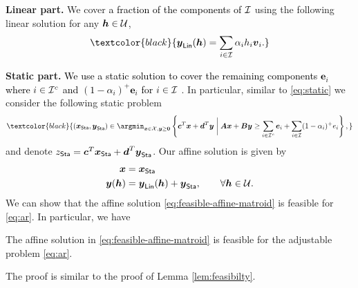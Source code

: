 \documentclass[moor]{informs1}              %
\newcommand{\mb}[1]{\ensuremath{\boldsymbol{#1}}}
\newcommand*{\red}{\textcolor{black}}
\begin{document}
\vspace{2mm}
\noindent
{\bf Linear part.}
We cover \red{ a fraction of the components of ${\cal I}$} using the following linear solution for any $ \mb h \in {\cal U}$,
\begin{equation} \label{eq:linear-sol-matroid}
\red{ \mb y_{\sf Lin}( \mb h )   = \sum_{i \in {\cal I}}   \alpha_i h_i {\mb v}_i .}
\end{equation}

\vspace{2mm}
\noindent
{\bf Static part.}   \red{We use a static solution to cover the remaining components $\mb e_i$ where $ i \in {\cal I}^c$ and $(1-\alpha_i)^+ \mb e_i$ for $ i \in {\cal I}$ }. In particular, similar to \eqref{eq:static}  we consider the following static problem
\begin{equation} \label{eq:static-matroid}
\red{ (\mb x_{\sf Sta}, \mb y_{\sf Sta}) \in \argmin_{\mb x \in {\cal X}, \mb y \geq \mb 0} \left\{ \mb c^T \mb x+ \mb d^T \mb y \; \bigg\vert \;  \mb A \mb x+ \mb B \mb y \geq \sum_{ i \in {\cal I}^c} \mb e_i     + \sum_{ i \in {\cal I}}  (1-\alpha_i)^+ e_i \right\},}
\end{equation}
and  denote  $z_{\sf Sta} =\mb c^T \mb x_{\sf Sta} + \mb d^T \mb y_{\sf Sta}$. Our affine solution is given by
\begin{equation}\label{eq:feasible-affine-matroid}
\begin{aligned}
\mb x &  =\mb x_{\sf Sta}  \\
\mb y ( \mb h ) &  =  \mb y_{\sf Lin}( \mb h ) +  \mb  y_{\sf Sta}, \qquad \forall \mb h \in{\cal U}. \\
\end{aligned}
\end{equation}
We can show that the  affine  solution  \eqref{eq:feasible-affine-matroid}  is feasible for \eqref{eq:ar}. In particular, we have
\begin{lemma}[\bf {Feasibility}] \label{lem:feasibilty-matroid}
The affine solution in \eqref{eq:feasible-affine-matroid}  is feasible for the adjustable problem \eqref{eq:ar}.  
\end{lemma}
The proof is similar to the proof of Lemma \ref{lem:feasibilty}.
\end{document}
